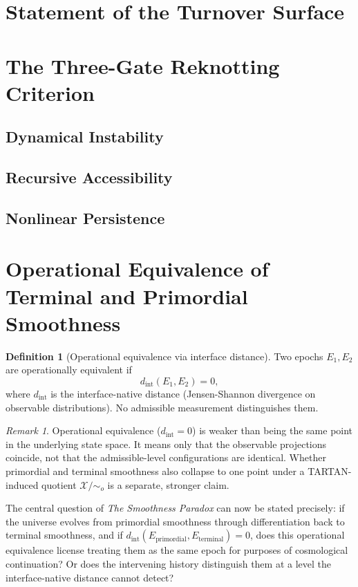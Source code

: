 \documentclass[12pt,a4paper,twoside,openright]{book}
\theoremstyle{plain}
\theoremstyle{definition}
\newtheorem{definition}[theorem]{Definition}
\theoremstyle{remark}
\newtheorem{remark}[theorem]{Remark}
\begin{document}
\section{Statement of the Turnover Surface}

\section{The Three-Gate Reknotting Criterion}

\subsection{Dynamical Instability}
\subsection{Recursive Accessibility}
\subsection{Nonlinear Persistence}

\section{Operational Equivalence of Terminal and Primordial Smoothness}

\begin{definition}[Operational equivalence via interface distance]
Two epochs $E_1, E_2$ are operationally equivalent if
\[
d_{\mathrm{int}}(E_1, E_2) = 0,
\]
where $d_{\mathrm{int}}$ is the interface-native distance (Jensen-Shannon divergence on observable distributions). No admissible measurement distinguishes them.
\end{definition}

\begin{remark}
Operational equivalence ($d_{\mathrm{int}} = 0$) is weaker than being the same point in the underlying state space. It means only that the observable projections coincide, not that the admissible-level configurations are identical. Whether primordial and terminal smoothness also collapse to one point under a TARTAN-induced quotient $\mathcal{X}/{\sim_o}$ is a separate, stronger claim.
\end{remark}

The central question of \emph{The Smoothness Paradox} can now be stated precisely: if the universe evolves from primordial smoothness through differentiation back to terminal smoothness, and if $d_{\mathrm{int}}(E_{\mathrm{primordial}}, E_{\mathrm{terminal}}) = 0$, does this operational equivalence license treating them as the same epoch for purposes of cosmological continuation? Or does the intervening history distinguish them at a level the interface-native distance cannot detect?
\end{document}
